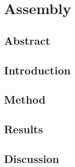 \section{Assembly}

    \subsection{Abstract}

        \noindent

    \subsection{Introduction}

        \noindent

    \subsection{Method}

        \noindent

    \subsection{Results}

        \noindent

    \subsection{Discussion}

        \noindent
